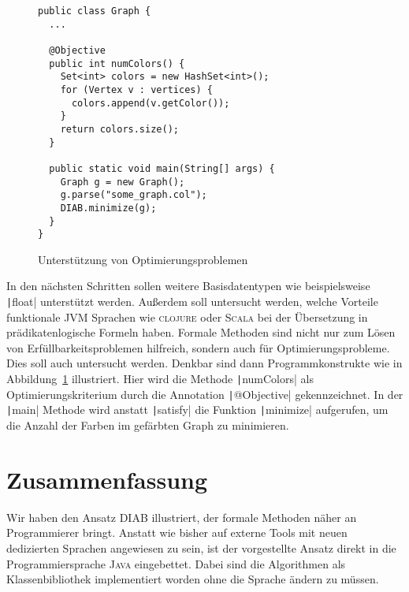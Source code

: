 \documentclass[a4paper,fontsize=12pt,headings=small,captions=tableheading,%
numbers=endperiod,abstracton,pdftex]{scrartcl}
\begin{document}
\begin{figure}[t]
  \centering
  \begin{verbatim}
public class Graph {
  ...

  @Objective
  public int numColors() {
    Set<int> colors = new HashSet<int>();
    for (Vertex v : vertices) {
      colors.append(v.getColor());
    }
    return colors.size();
  }

  public static void main(String[] args) {
    Graph g = new Graph();
    g.parse("some_graph.col");
    DIAB.minimize(g);
  }
}
  \end{verbatim}
  \medskip
  \caption{Unterstützung von Optimierungsproblemen}
  \label{fig:optimization}
\end{figure}

In den nächsten Schritten sollen weitere Basisdatentypen wie beispielsweise
\texttt|float| unterstützt werden.  Außerdem soll untersucht werden,
welche Vorteile funktionale JVM Sprachen wie \textsc{clojure} oder
\textsc{Scala} bei der Übersetzung in prädikatenlogische Formeln haben.  Formale
Methoden sind nicht nur zum Lösen von Erfüllbarkeitsproblemen hilfreich, sondern
auch für Optimierungsprobleme.  Dies soll auch untersucht werden.  Denkbar sind
dann Programmkonstrukte wie in Abbildung~\ref{fig:optimization} illustriert.
Hier wird die Methode \texttt|numColors| als Optimierungskriterium
durch die Annotation \texttt|@Objective| gekennzeichnet.  In der
\texttt|main| Methode wird anstatt \texttt|satisfy| die
Funktion \texttt|minimize| aufgerufen, um die Anzahl der Farben im
gefärbten Graph zu minimieren.


\section{Zusammenfassung}
Wir haben den Ansatz \textsc{DIAB} illustriert, der formale Methoden näher an
Programmierer bringt.  Anstatt wie bisher auf externe Tools mit neuen
dedizierten Sprachen angewiesen zu sein, ist der vorgestellte Ansatz direkt in
die Programmiersprache \textsc{Java} eingebettet.  Dabei sind die Algorithmen
als Klassenbibliothek implementiert worden ohne die Sprache ändern zu müssen.


\end{document}
